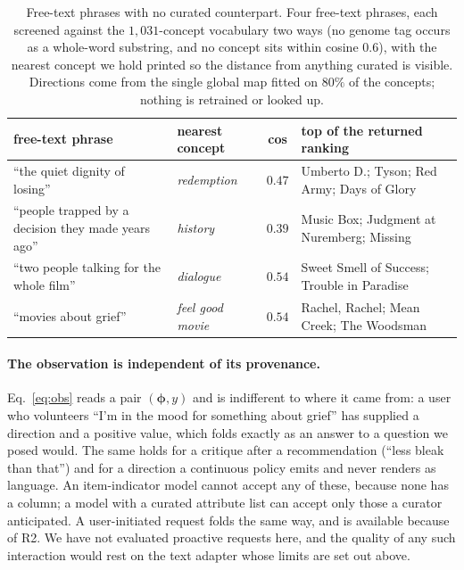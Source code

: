 \documentclass[manuscript,screen,review]{acmart}
\newcommand{\bphi}{\boldsymbol{\phi}}
\begin{document}
\begin{table}[t]\centering\small
\setlength{\tabcolsep}{5pt}
\begin{tabular}{p{4.2cm}p{2.0cm}c p{5.4cm}}
\toprule
free-text phrase & nearest concept & cos & top of the returned ranking \\
\midrule
``the quiet dignity of losing'' & \emph{redemption} & $0.47$ & Umberto D.; Tyson; Red Army; Days of Glory \\
``people trapped by a decision they made years ago'' & \emph{history} & $0.39$ & Music Box; Judgment at Nuremberg; Missing \\
``two people talking for the whole film'' & \emph{dialogue} & $0.54$ & Sweet Smell of Success; Trouble in Paradise \\
``movies about grief'' & \emph{feel good movie} & $0.54$ & Rachel, Rachel; Mean Creek; The Woodsman \\
\bottomrule
\end{tabular}
\caption{Free-text phrases with no curated counterpart. Four free-text phrases, each screened against the $1{,}031$-concept vocabulary two ways (no genome tag occurs as a whole-word substring, and no concept sits within cosine $0.6$), with the nearest concept we hold printed so the distance from anything curated is visible. Directions come from the single global map fitted on $80\%$ of the concepts; nothing is retrained or looked up.}
\label{tab:freetext}
\end{table}

\paragraph{The observation is independent of its provenance.} Eq.~\eqref{eq:obs} reads a pair $(\bphi,y)$ and is indifferent to where it came from: a user who volunteers ``I'm in the mood for something about grief'' has supplied a direction and a positive value, which folds exactly as an answer to a question we posed would. The same holds for a critique after a recommendation (``less bleak than that'') and for a direction a continuous policy emits and never renders as language. An item-indicator model cannot accept any of these, because none has a column; a model with a curated attribute list can accept only those a curator anticipated. A user-initiated request folds the same way, and is available because of R2. We have not evaluated proactive requests here, and the quality of any such interaction would rest on the text adapter whose limits are set out above.
\end{document}
